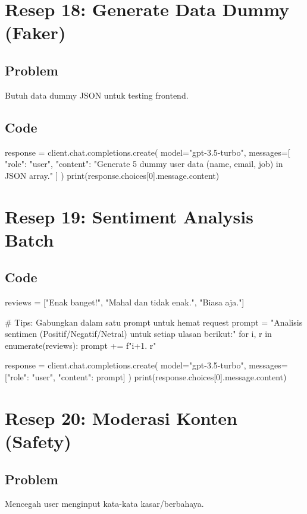 \section{Resep 18: Generate Data Dummy (Faker)}

\subsection*{Problem}
Butuh data dummy JSON untuk testing frontend.

\subsection*{Code}
\begin{codeblock}[language=Python]
response = client.chat.completions.create(
    model="gpt-3.5-turbo",
    messages=[
        {"role": "user", "content": "Generate 5 dummy user data (name, email, job) in JSON array."}
    ]
)
print(response.choices[0].message.content)
\end{codeblock}

\section{Resep 19: Sentiment Analysis Batch}

\subsection*{Code}
\begin{codeblock}[language=Python]
reviews = ["Enak banget!", "Mahal dan tidak enak.", "Biasa aja."]

# Tips: Gabungkan dalam satu prompt untuk hemat request
prompt = "Analisis sentimen (Positif/Negatif/Netral) untuk setiap ulasan berikut:\n"
for i, r in enumerate(reviews):
    prompt += f"{i+1}. {r}\n"

response = client.chat.completions.create(
    model="gpt-3.5-turbo",
    messages=[{"role": "user", "content": prompt}]
)
print(response.choices[0].message.content)
\end{codeblock}

\section{Resep 20: Moderasi Konten (Safety)}

\subsection*{Problem}
Mencegah user menginput kata-kata kasar/berbahaya.

